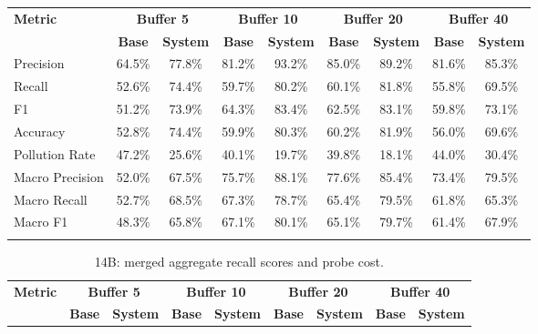 \documentclass[pdflatex,sn-mathphys-num]{sn-jnl}%
\theoremstyle{thmstyleone}%
\theoremstyle{thmstyletwo}%
\theoremstyle{thmstylethree}%
\begin{document}
\begin{appendices}
\begin{landscape}
\begin{longtable}{@{}p{3.8cm}cccccccc@{}}
\toprule
\textbf{Metric} & \multicolumn{2}{c}{\textbf{Buffer 5}} & \multicolumn{2}{c}{\textbf{Buffer 10}} & \multicolumn{2}{c}{\textbf{Buffer 20}} & \multicolumn{2}{c}{\textbf{Buffer 40}} \\
\cmidrule(lr){2-3}\cmidrule(lr){4-5}\cmidrule(lr){6-7}\cmidrule(lr){8-9}
 & \textbf{Base} & \textbf{System} & \textbf{Base} & \textbf{System} & \textbf{Base} & \textbf{System} & \textbf{Base} & \textbf{System} \\
\midrule
\endhead
Precision & 64.5\% & 77.8\% & 81.2\% & 93.2\% & 85.0\% & 89.2\% & 81.6\% & 85.3\% \\
Recall & 52.6\% & 74.4\% & 59.7\% & 80.2\% & 60.1\% & 81.8\% & 55.8\% & 69.5\% \\
F1 & 51.2\% & 73.9\% & 64.3\% & 83.4\% & 62.5\% & 83.1\% & 59.8\% & 73.1\% \\
Accuracy & 52.8\% & 74.4\% & 59.9\% & 80.3\% & 60.2\% & 81.9\% & 56.0\% & 69.6\% \\
Pollution Rate & 47.2\% & 25.6\% & 40.1\% & 19.7\% & 39.8\% & 18.1\% & 44.0\% & 30.4\% \\
Macro Precision & 52.0\% & 67.5\% & 75.7\% & 88.1\% & 77.6\% & 85.4\% & 73.4\% & 79.5\% \\
Macro Recall & 52.7\% & 68.5\% & 67.3\% & 78.7\% & 65.4\% & 79.5\% & 61.8\% & 65.3\% \\
Macro F1 & 48.3\% & 65.8\% & 67.1\% & 80.1\% & 65.1\% & 79.7\% & 61.4\% & 67.9\% \\
\botrule
\end{longtable}
\normalsize
\end{landscape}
\begin{landscape}
\tiny
\begin{longtable}{@{}p{3.8cm}cccccccc@{}}
\caption{14B: merged aggregate recall scores and probe cost.}\label{tab:app_14b_recall_agg}\\

\toprule
\textbf{Metric} & \multicolumn{2}{c}{\textbf{Buffer 5}} & \multicolumn{2}{c}{\textbf{Buffer 10}} & \multicolumn{2}{c}{\textbf{Buffer 20}} & \multicolumn{2}{c}{\textbf{Buffer 40}} \\
\cmidrule(lr){2-3}\cmidrule(lr){4-5}\cmidrule(lr){6-7}\cmidrule(lr){8-9}
 & \textbf{Base} & \textbf{System} & \textbf{Base} & \textbf{System} & \textbf{Base} & \textbf{System} & \textbf{Base} & \textbf{System} \\
\midrule
\endfirsthead


\end{longtable}
\end{landscape}
\end{appendices}
\end{document}
